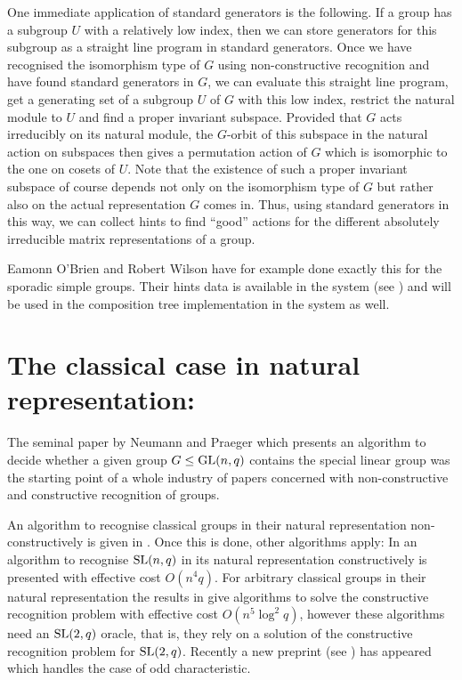 \begin{App}
\label{hintsstabchains}
One immediate application of standard generators is the following. If
a group has a subgroup $U$ with a relatively low index, then we can store
generators for this subgroup as a straight line program in standard
generators. Once we have recognised the isomorphism type of $G$
using non-constructive recognition and have found standard generators
in $G$, we can evaluate this straight line program, get a
generating set of a subgroup $U$ of $G$ with this low index, restrict
the natural module to $U$ and find a proper invariant subspace. Provided
that $G$ acts irreducibly on its natural module, the
$G$-orbit of this subspace in the natural action on subspaces then
gives a permutation action of $G$ which is isomorphic to the one on
cosets of $U$. Note that the existence of such a proper invariant subspace 
of course depends not only on the isomorphism type of $G$ but rather
also on the actual representation $G$ comes in.
Thus, using standard generators in this way, we can collect hints
to find ``good'' actions for the different absolutely irreducible
matrix representations of a group.

Eamonn O'Brien and Robert Wilson have for example done exactly this
for the sporadic simple groups. Their hints data is available in the
{\MAGMA} system (see \cite{Magma}) and will be used in the composition tree
implementation in the {\GAP} system as well.
\end{App}

\section{The classical case in natural representation: }
\label{solveD8}

The seminal paper by Neumann and Praeger \cite{neumann-praeger} which
presents an algorithm to decide whether a given group $G \le \GL(n,q)$
contains the special linear group was the starting point of a whole
industry of papers concerned with non-constructive and constructive
recognition of groups.

An algorithm to recognise classical groups in their
natural representation non-constructively is given in
\cite{classicalnonconstructive}. Once this is done, other algorithms
apply: In \cite{slrecogconstr} an algorithm to recognise $\SL(n,q)$
in its natural representation constructively is presented with
effective cost $O(n^4q)$. For arbitrary classical groups in their
natural representation the results in \cite{peteconstructiveclassical}
give algorithms to solve the constructive recognition problem with
effective cost $O(n^5 \log^2 q)$, however these algorithms need an
$\SL(2,q)$ oracle, that is, they rely on a solution of the constructive
recognition problem for $\SL(2,q)$. Recently a new preprint (see
\cite{recogclassicalodd}) has appeared which handles the case of odd
characteristic.

